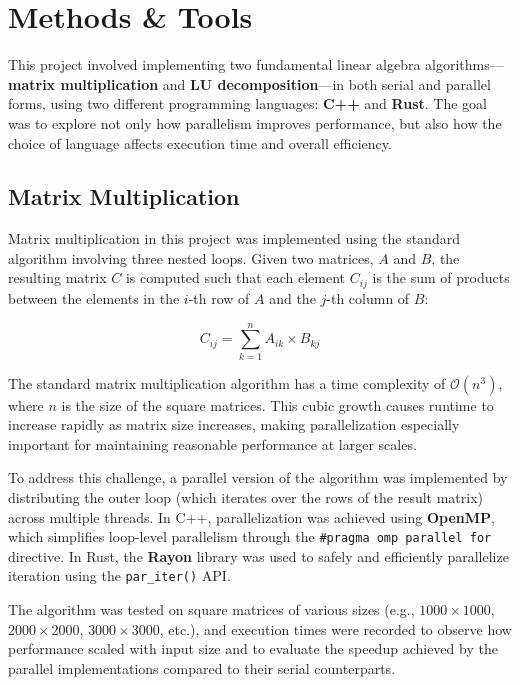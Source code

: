 \documentclass[12pt]{article}
\begin{document}
\section{Methods \& Tools}

This project involved implementing two fundamental linear algebra algorithms---\textbf{matrix multiplication} and \textbf{LU decomposition}---in both
serial and parallel forms, using two different programming languages: \textbf{C++} and \textbf{Rust}. The goal was to explore not only how parallelism
improves performance, but also how the choice of language affects execution time and overall efficiency.

\subsection{Matrix Multiplication}

Matrix multiplication in this project was implemented using the standard algorithm involving three nested loops. Given two matrices, \( A \) and \( B \),
the resulting matrix \( C \) is computed such that each element \( C_{ij} \) is the sum of products between the elements in the \( i \)-th row of \( A \)
and the \( j \)-th column of \( B \):

\[
    C_{ij} = \sum_{k=1}^{n} A_{ik} \times B_{kj}
\]

The standard matrix multiplication algorithm has a time complexity of \( \mathcal{O}(n^3) \), where \( n \) is the size of the square matrices.
This cubic growth causes runtime to increase rapidly as matrix size increases, making parallelization especially important for maintaining reasonable
performance at larger scales.

To address this challenge, a parallel version of the algorithm was implemented by distributing the outer loop (which iterates over the rows of the
result matrix) across multiple threads. In C++, parallelization was achieved using \textbf{OpenMP}, which simplifies loop-level parallelism through
the \texttt{\#pragma omp parallel for} directive. In Rust, the \textbf{Rayon} library was used to safely and efficiently parallelize iteration using
the \texttt{par\_iter()} API.

The algorithm was tested on square matrices of various sizes (e.g., \(1000 \times 1000\), \(2000 \times 2000\), \(3000 \times 3000\), etc.), and execution
times were recorded to observe how performance scaled with input size and to evaluate the speedup achieved by the parallel implementations compared to
their serial counterparts.
\end{document}
